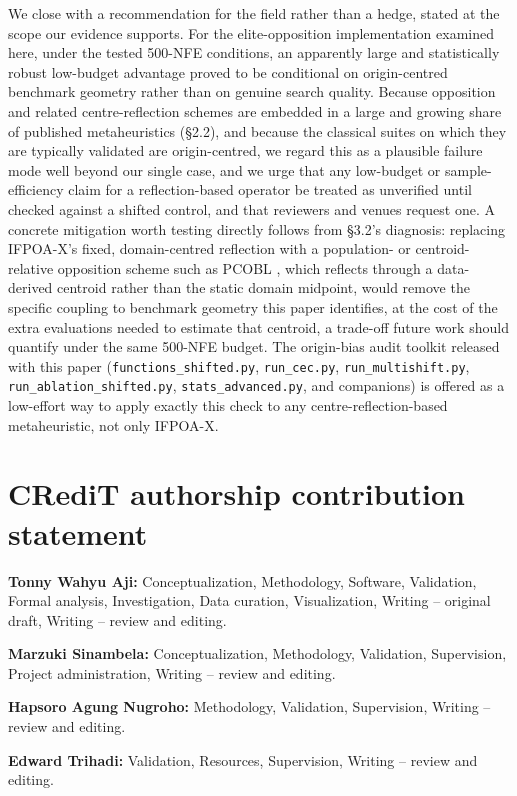 \documentclass[preprint,12pt]{elsarticle}
\begin{document}
We close with a recommendation for the field rather than a hedge, stated at the scope our evidence supports. For the elite-opposition implementation examined here, under the tested 500-NFE conditions, an apparently large and statistically robust low-budget advantage proved to be conditional on origin-centred benchmark geometry rather than on genuine search quality. Because opposition and related centre-reflection schemes are embedded in a large and growing share of published metaheuristics (\S2.2), and because the classical suites on which they are typically validated are origin-centred, we regard this as a plausible failure mode well beyond our single case, and we urge that any low-budget or sample-efficiency claim for a reflection-based operator be treated as unverified until checked against a shifted control, and that reviewers and venues request one. A concrete mitigation worth testing directly follows from \S3.2's diagnosis: replacing IFPOA-X's fixed, domain-centred reflection with a population- or centroid-relative opposition scheme such as PCOBL \cite{si2023pcobl}, which reflects through a data-derived centroid rather than the static domain midpoint, would remove the specific coupling to benchmark geometry this paper identifies, at the cost of the extra evaluations needed to estimate that centroid, a trade-off future work should quantify under the same 500-NFE budget. The origin-bias audit toolkit released with this paper (\texttt{functions\_shifted.py}, \texttt{run\_cec.py}, \texttt{run\_multishift.py}, \texttt{run\_ablation\_shifted.py}, \texttt{stats\_advanced.py}, and companions) is offered as a low-effort way to apply exactly this check to any centre-reflection-based metaheuristic, not only IFPOA-X.

\section*{CRediT authorship contribution statement}

\textbf{Tonny Wahyu Aji:} Conceptualization, Methodology, Software, Validation, Formal analysis, Investigation, Data curation, Visualization, Writing -- original draft, Writing -- review and editing.

\textbf{Marzuki Sinambela:} Conceptualization, Methodology, Validation, Supervision, Project administration, Writing -- review and editing.

\textbf{Hapsoro Agung Nugroho:} Methodology, Validation, Supervision, Writing -- review and editing.

\textbf{Edward Trihadi:} Validation, Resources, Supervision, Writing -- review and editing.
\end{document}

